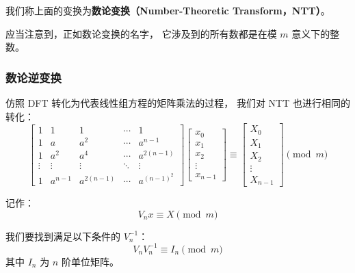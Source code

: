 \documentclass[12pt, UTF8]{article}
\begin{document}
    我们称上面的变换为\textbf{数论变换（Number-Theoretic Transform，NTT）}。

    \bigskip
    应当注意到，正如数论变换的名字，
    它涉及到的所有数都是在模 $m$ 意义下的整数。

    \subsubsection{数论逆变换}
    仿照 DFT 转化为代表线性组方程的矩阵乘法的过程，
    我们对 NTT 也进行相同的转化：
    \begin{equation*}
        \begin{bmatrix}
            1 & 1 & 1 & \cdots & 1
            \\
            1 & a & a^2 & \cdots & a^{n - 1}
            \\
            1 & a^2 & a^4 & \cdots & a^{2(n - 1)}
            \\
            \vdots & \vdots & \vdots & \ddots & \vdots
            \\
            1 & a^{n - 1} & a^{2(n - 1)} & \cdots & a^{(n - 1)^2}
        \end{bmatrix}
        \begin{bmatrix}
            x_0
            \\
            x_1
            \\
            x_2
            \\
            \vdots
            \\
            x_{n - 1}
        \end{bmatrix}
        \equiv
        \begin{bmatrix}
            X_0
            \\
            X_1
            \\
            X_2
            \\
            \vdots
            \\
            X_{n - 1}
        \end{bmatrix}
        \pmod {m}
    \end{equation*}

    记作：
    \begin{equation*}
        V_n x \equiv X \pmod {m}
    \end{equation*}

    \bigskip
    我们要找到满足以下条件的 $V_n^{-1}$：
    \begin{equation*}
        V_n V_n^{-1} \equiv I_n \pmod {m}
    \end{equation*}
    其中 $I_n$ 为 $n$ 阶单位矩阵。
\end{document}
